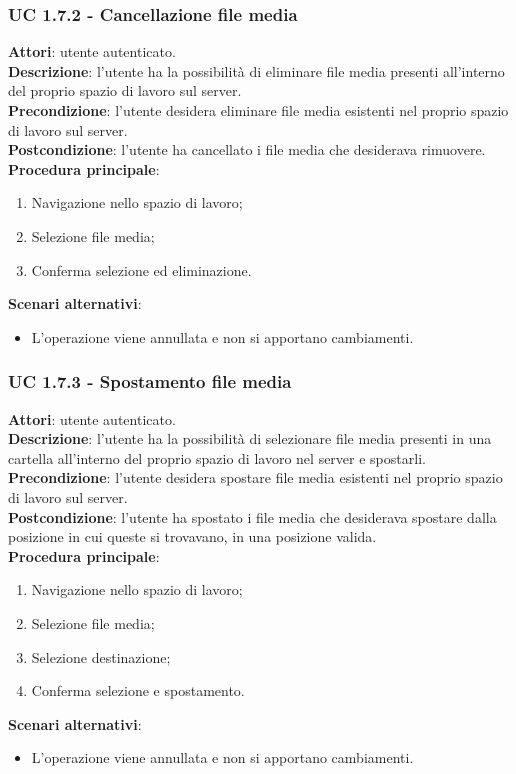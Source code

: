 	\subsubsection{UC 1.7.2 - Cancellazione file media}{
		\label{uc1.7.2}
		\textbf{Attori}: utente autenticato.	\\
		\textbf{Descrizione}: l'utente ha la possibilità di eliminare file media presenti all'interno del proprio spazio di lavoro sul server. \\
		\textbf{Precondizione}: l'utente desidera eliminare file media esistenti nel proprio spazio di lavoro sul server.	\\
		\textbf{Postcondizione}: l'utente ha cancellato i file media che desiderava rimuovere.	\\
		\textbf{Procedura principale}:
		\begin{enumerate}
			\item Navigazione nello spazio di lavoro;
			\item Selezione file media;
			\item Conferma selezione ed eliminazione.
		\end{enumerate}
		\textbf{Scenari alternativi}: 
		\begin{itemize}
			\item L'operazione viene annullata e non si apportano cambiamenti.
		\end{itemize}
		}
	\subsubsection{UC 1.7.3 - Spostamento file media}{
		\label{uc1.7.3}
		\textbf{Attori}: utente autenticato.	\\
		\textbf{Descrizione}: l'utente ha la possibilità di selezionare file media presenti in una cartella all'interno del proprio spazio di lavoro nel server e spostarli. \\
		\textbf{Precondizione}: l'utente desidera spostare file media esistenti nel proprio spazio di lavoro sul server.	\\
		\textbf{Postcondizione}: l'utente ha spostato i file media che desiderava spostare dalla posizione in cui queste si trovavano, in una posizione valida.	\\
		\textbf{Procedura principale}:
		\begin{enumerate}
			\item Navigazione nello spazio di lavoro;
			\item Selezione file media;
			\item Selezione destinazione;
			\item Conferma selezione e spostamento.
		\end{enumerate}
		\textbf{Scenari alternativi}: 
		\begin{itemize}
			\item L'operazione viene annullata e non si apportano cambiamenti.
		\end{itemize}
		}
